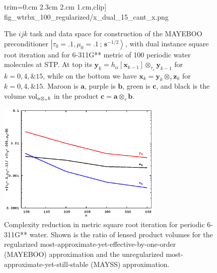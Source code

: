 \documentclass[letterpaper,twocolumn,amsmath,amsfont,amssymb,english,aps,jcp,preprintnumbers,groupaddress,nofootinbib,tightenlines,floatfix]{revtex4}
\newcommand{\mat}[1]{\boldsymbol{#1}}
\newcommand{\ot}{  {\scriptstyle \otimes}_{ \tau } }
\newcommand{\ots}{ {\scriptstyle \otimes}_{ \! \tau_s } }
\theoremstyle{plain}
\theoremstyle{remark}
\theoremstyle{plain}
\begin{document}
\begin{figure}[tb]
{                        trim={0.cm 2.3cm 2.cm 1.cm},clip]
                        {fig_wtrbx_100_regularized/x_dual_15_cant_x.png}} 
\caption{
The $ijk$ task and data space for construction of the MAYEBOO preconditioner 
$\left|\tau_0=.1,\mu_0=.1\, ; \,\scriptstyle{\mat{s}^{-1/2}} \right>$, with 
dual instance square root iteration  and for 6-311G** metric of 100 periodic water molecules
at STP.  At top its  $\mat{y}_k=h_\alpha[ \mat{x}_{k-1} ] \ots \mat{y}_{k-1}$
for $k=0,4,\& 15$, while on the bottom we have $\mat{x}_k=  \mat{y}_{k}  \ot \mat{z}_{k}$ for $k=0,4, \& 15$.
Maroon is $\mat{a}$, purple is $\mat{b}$, green is $\mat{c}$,  and black is the volume ${\rm vol}_{a \ot b}$
in the product $\mat{c}=\mat{a} \ot \mat{b}$.}\label{Lensing2}
\end{figure}

\begin{figure}[tb] 
\includegraphics[width=7.8cm,keepaspectratio=true,trim={0.cm 0.cm 0.cm 0.cm},clip]
                 {fig_wtrboxes_regular_and_unleaded/pcnt_volume_water_boxes.eps} 
\caption{ 
Complexity reduction in metric square root iteration for periodic 6-311G** water. 
Shown is the ratio of lensed product volumes for the regularized most-approximate-yet-effective-by-one-order (MAYEBOO) 
approximation and the unregularized most-approximate-yet-still-stable (MAYSS) approximation.}\label{HilbertVsTravelOrder}
\end{figure}
\end{document}
